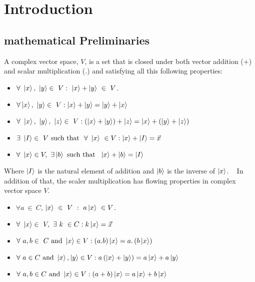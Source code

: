 \chapter{Introduction}

\section{ mathematical Preliminaries }



\begin{defn}


A complex vector space, $V$, is a set that is closed under both vector addition
($ +$) and scalar multiplication (.) and satisfying all this following properties:
\begin{itemize}
\item $\forall~ \ket{x},~\ket{y} \in ~ V : ~\ket{x}+\ket{y} ~\in~ V $.
\item $\forall \ket{x},~\ket{y} \in ~ V : \ket{x}+\ket{y}=\ket{y}+\ket{x}$
\item $\forall~ \ket{x},~\ket{y}, ~\ket{z} \in ~ V:\left(\ket{x}+\ket{y}\right)+\ket{z}=\ket{x}+\left(\ket{y}+\ket{z}\right)$
\item $\exists ~\ket{I} \in ~V~ \text{such that }~  \forall~ \ket{x} ~\in  V: \ket{x}+\ket{I}=\vec{x}$
\item $\forall ~\ket{x} \in V,~ \exists \ket{b} ~ \text{such that }  ~\ket{x}+\ket{b}= \ket{I}$
\end{itemize}
Where $\ket{I}$ is the natural element of addition and $\ket{b}$ is the inverse of $\ket{x}$. ~
In addition  of that, the scaler  multiplication has flowing properties in complex vector space $V$.
\begin{itemize}
\item $\forall a~\in ~C$, $\ket{x}~\in ~V~ :~ a\ket{x}~ \in V$.
\item $\forall ~\ket{x} \in ~V,~ \exists~ k ~\in C :k\ket{x}=\vec{x}$
\item $\forall ~ a,b \in ~C ~\text{and} ~ \ket{x}\in V :\left(a.b\right) \ket{x}=a.\left(b \ket{x}\right)$
\item $\forall ~ a \in C ~\text{and} ~ \ket{x}, \ket{y}\in V:a\left(\ket{x}+\ket{y}\right)=a\ket{x}+a\ket{y}$
\item $\forall ~ a,b \in C ~\text{and} ~ \ket{x}\in V:\left(a+b\right)\ket{x}=a\ket{x}+b\ket{x}$
\end{itemize}
\end{defn}

